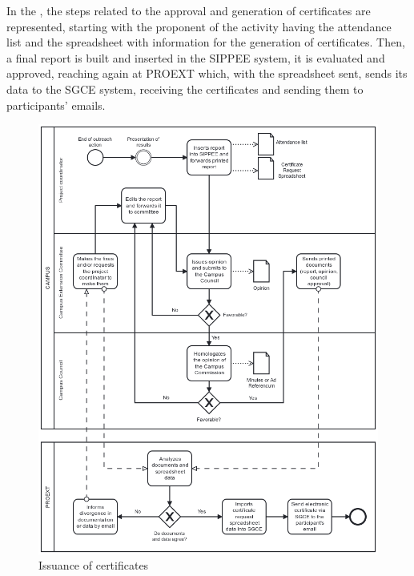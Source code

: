 
In the , the steps related to the approval and generation of certificates are represented, starting with the proponent of the activity having the attendance list and the spreadsheet with information for the generation of certificates. 
Then, a final report is built and inserted in the \ac{SIPPEE} system, it is evaluated and approved, reaching again at \ac{PROEXT} which, with the spreadsheet sent, sends its data to the \ac{SGCE} system, receiving the certificates and sending them to participants' emails.

\begin{figure}[htb]
  \caption{Issuance of certificates}\label{fig:issuance-certificates}
  \begin{center}
    \includegraphics[width=16cm]{img/emissaoDeCertificados.png}
  \end{center}
\end{figure}

